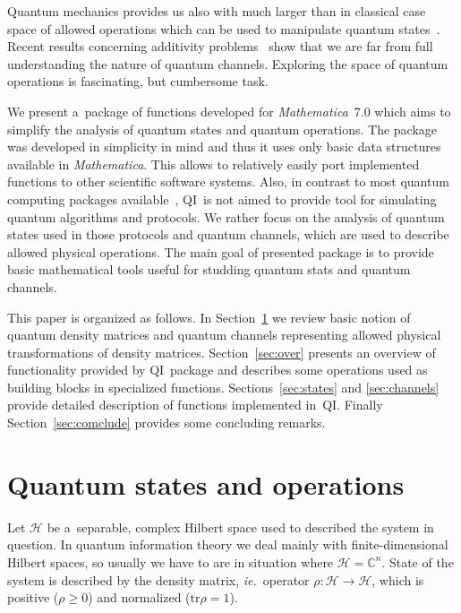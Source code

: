 \documentclass{elsart}
\newcommand{\Mathematica}{\emph{Mathematica}}
\newcommand{\1}{{\rm 1\hspace{-0.9mm}l}}
\newcommand{\tr}{\mathrm{tr}}
\newcommand{\qi}{QI}
\newcommand{\HS}[1]{\ensuremath{\mathcal{#1}}} %
\newcommand{\Cplx}{\ensuremath{\mathbb{C}}}
\newcommand{\ie}{\emph{ie.}}
\begin{document}
Quantum mechanics provides us also with much larger than in classical case space
of allowed operations which can be used to manipulate quantum
states~\cite{hayashi,BZ06}. Recent results concerning additivity
problems~\cite{hastings09superadditivity} show that we are far from full
understanding the nature of quantum channels. Exploring the space of quantum
operations is fascinating, but cumbersome task.


We present a~package of functions developed for \Mathematica\ 7.0 which aims to
simplify the analysis of quantum states and quantum operations. The package was 
developed in simplicity in mind and thus it uses only basic data structures
available in \Mathematica. This allows to relatively easily port implemented
functions to other scientific software systems. Also, in contrast to most
quantum computing packages available~\cite{qdensity,qucalc,quantum2}, \qi\ is
not aimed to provide tool for simulating quantum algorithms and protocols. We
rather focus on the analysis of quantum states used in those protocols and
quantum channels, which are used to describe allowed physical operations. The
main goal of presented package is to provide basic mathematical tools useful for
studding quantum stats and quantum channels.

This paper is organized as follows. In Section~\ref{sec:qi-intro} we review
basic notion of quantum density matrices and quantum channels representing
allowed physical transformations of density matrices. Section~\ref{sec:over}
presents an overview of functionality provided by \qi\ package and describes
some operations used as building blocks in specialized functions.
Sections~\ref{sec:states} and \ref{sec:channels} provide detailed description of
functions implemented in~\qi. Finally Section~\ref{sec:comclude} provides some
concluding remarks.

\section{Quantum states and operations}\label{sec:qi-intro}
Let $\HS{H}$ be a~separable, complex Hilbert space used to described the system
in question. In quantum information theory we deal mainly with
finite-dimensional Hilbert spaces, so usually we have to are in situation where
$\HS{H}=\Cplx^n$. State of the system is described by the density matrix, \ie\
operator $\rho:\HS{H}\rightarrow\HS{H}$, which is positive ($\rho\geq0$) and
normalized ($\tr{\rho}=1$). 
\end{document}
